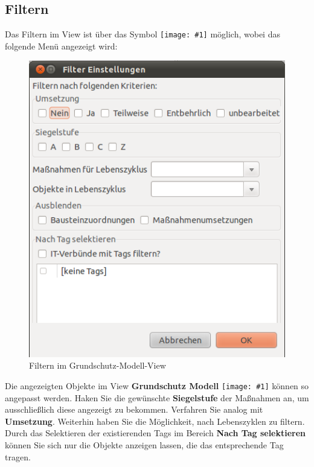 \documentclass[a4paper,10pt]{book}
\newcommand{\icon}[1]{\texttt{[image: \#1]}}
\begin{document}
\subsection{Filtern}
Das Filtern im View ist über das Symbol \icon{Icon/Filter.png} möglich, wobei das folgende Menü angezeigt wird:
\newline
\begin{figure}[htb!]
  \centering
  \includegraphics[scale=.65]{Screenshot/Filtern_gsmodell.png}
  \caption{\label{Filtern im Grundschutz-Modell-View} Filtern im Grundschutz-Modell-View}
\end{figure}
\newline
Die angezeigten Objekte im View \textbf{Grundschutz Modell} \icon{Icon/GS_Modell.png} können so angepasst werden.
Haken Sie die gewünschte \textbf{Siegelstufe}
der Maßnahmen an, um ausschließlich diese angezeigt zu bekommen. Verfahren Sie analog mit \textbf{Umsetzung}. Weiterhin haben Sie die Möglichkeit,
nach Lebenszyklen zu filtern. Durch das Selektieren der existierenden Tags im Bereich \textbf{Nach Tag selektieren} können Sie sich nur die
Objekte anzeigen lassen, die das entsprechende Tag tragen.
\end{document}

